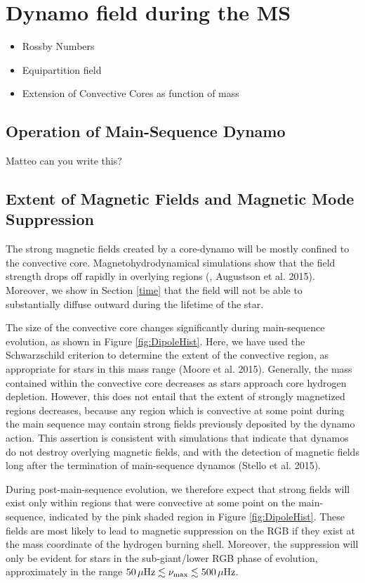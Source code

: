 \section{Dynamo field during the MS}
\begin{itemize}
\item Rossby Numbers
\item Equipartition field
\item Extension of Convective Cores as function of mass
\end{itemize}


\subsection{Operation of Main-Sequence Dynamo}

Matteo can you write this?

\subsection{Extent of Magnetic Fields and Magnetic Mode Suppression}

The strong magnetic fields created by a core-dynamo will be mostly confined to the convective core. Magnetohydrodynamical simulations show that the field strength drops off rapidly in overlying regions (\citealt{Featherstone_2009}, Augustson et al. 2015). Moreover, we show in Section \ref{time} that the field will not be able to substantially diffuse outward during the lifetime of the star. 

The size of the convective core changes significantly during main-sequence evolution, as shown in Figure \ref{fig:DipoleHist}. Here, we have used the Schwarzschild criterion to determine the extent of the convective region, as appropriate for stars in this mass range (Moore et al. 2015). Generally, the mass contained within the convective core decreases as stars approach core hydrogen depletion. However, this does not entail that the extent of strongly magnetized regions decreases, because any region which is convective at some point during the main sequence may contain strong fields previously deposited by the dynamo action. This assertion is consistent with simulations \citep{Featherstone_2009} that indicate that dynamos do not destroy overlying magnetic fields, and with the detection of magnetic fields long after the termination of main-sequence dynamos (Stello et al. 2015).

During post-main-sequence evolution, we therefore expect that strong fields will exist only within regions that were convective at some point on the main-sequence, indicated by the pink shaded region in Figure \ref{fig:DipoleHist}. These fields are most likely to lead to magnetic suppression on the RGB if they exist at the mass coordinate of the hydrogen burning shell. Moreover, the suppression will only be evident for stars in the sub-giant/lower RGB phase of evolution, approximately in the range $50 \, \mu {\rm Hz} \lesssim \nu_{\rm max} \lesssim 500 \, \mu {\rm Hz}$.

